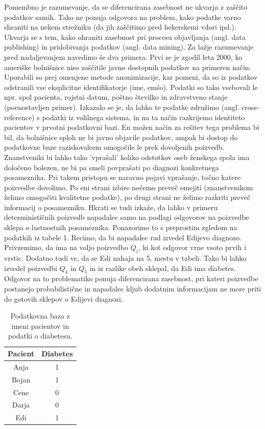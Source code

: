 \documentclass[12pt,a4paper]{amsart}
\theoremstyle{definition} %
\theoremstyle{plain} %
\begin{document}
Pomembno je razumevanje, da se diferencirana zasebnost ne ukvarja z zaščito podatkov samih. Tako ne ponuja odgovora na problem, kako podatke varno shraniti na nekem strežniku (da jih zaščitimo pred hekerskemi vdori ipd.). Ukvarja se s tem, kako ohraniti zasebnost pri procesu objavljanja (angl. data publishing) in pridobivanja podatkov (angl. data mining). Za lažje razumevanje pred nadaljevanjem navedimo še dva primera. Prvi se je zgodil leta 2000, ko ameriške bolnišnice niso zaščitile javno dostopnih podatkov na primeren način. Uporabili so prej omenjene metode anonimizacije, kar pomeni, da so iz podatkov odstranili vse eksplicitne identifikatorje (ime, emšo). Podatki so tako vsebovali le npr. spol pacienta, rojstni datum, poštno številko in zdravstveno stanje (poenostavljen primer). Izkazalo se je, da lahko te podatke združimo (angl. cross-reference) s podatki iz volilnega sistema, in na ta način razkrijemo identiteto pacientov v prvotni podatkovni bazi. En možen način za rešitev tega problema bi bil, da bolnišnice sploh ne bi javno objavile podatkov, ampak bi dostop do podatkovne baze raziskovalcem omogočile le prek dovoljenih poizvedb. Znanstveniki bi lahko tako 'vprašali' koliko odstotkov oseb ženskega spola ima določeno bolezen, ne bi pa smeli povprašati po diagnozi konkretnega posameznika. Pri takem pristopu se naravno pojavi vprašanje, točno katere poizvedbe dovolimo. Po eni strani izbire nočemo preveč omejiti (znanstvenikom želimo omogočiti kvalitetne podatke), po drugi strani ne želimo razkriti preveč informacij o posamezniku. Hkrati se tudi izkaže, da lahko v primeru determinističnih poizvedb napadalec samo na podlagi odgovorov na poizvedbe sklepa o lastnostnih posameznika. Ponazorimo to s preprostim zgledom na podatkih iz tabele 1. Recimo, da bi napadalec rad izvedel Edijevo diagnozo. Privzemimo, da ima na voljo poizvedbo $Q_i$, ki kot odgovor vrne vsoto prvih i vrstic. Dodatno tudi ve, da se Edi nahaja na 5. mestu v tabeli. Tako bi lahko izvedel poizvedbi $Q_4$ in $Q_5$ in iz razlike obeh sklepal, da Edi ima diabetes.  Odgovor na to problematiko ponuja diferencirana zasebnost, pri kateri poizvedbe postanejo probabilistične in napadalec kljub dodatnim informacijam ne more priti do gotovih sklepov o Edijevi diagnozi.
\begin{table}
\begin{center}
 \begin{tabular}{| c | c |} 
 \hline
 \textbf{Pacient} & \textbf{Diabetes}  \\ [0.5ex] 
 \hline
 Anja & 1  \\ 
 \hline
 Bojan & 1\\
 \hline
 Cene & 0 \\
 \hline
 Darja & 0  \\
 \hline
 Edi & 1  \\  
 \hline
\end{tabular}
\caption{Podatkovna baza z imeni pacientov in podatki o diabetesu.}
\end{center}
\end{table}
\end{document}
